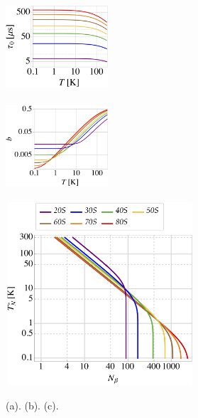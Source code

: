\documentclass[10pt,twocolumn]{article}
\begin{document}
\begin{figure}[]
\begin{minipage}[c][4.6cm][t]{.24\textwidth}
  \vspace*{\fill}
  \centering
  \includegraphics[width=3.8cm,height=3.2cm]{tauloglog.png}
  \subcaption{}
  \label{fig:cthcal1_4}
\end{minipage}%
\begin{minipage}[c][4.6cm][t]{.24\textwidth}
  \vspace*{\fill}
  \centering
  \includegraphics[width=3.8cm,height=3.2cm]{bloglog.png}
  \subcaption{}
  \label{fig:cthcal2_4}
\end{minipage}%
\vspace*{1.8cm}
\begin{minipage}[c][6cm][b]{.46\textwidth}
  \centering
  \includegraphics[width=7.0cm,height=6.8cm]{TvsNbloglog.png}
  \subcaption{}
  \label{fig:cthcal3_4}
\end{minipage}
\caption{(a). (b). (c).}\label{fig:cthcal_4}
\end{figure}
\end{document}
